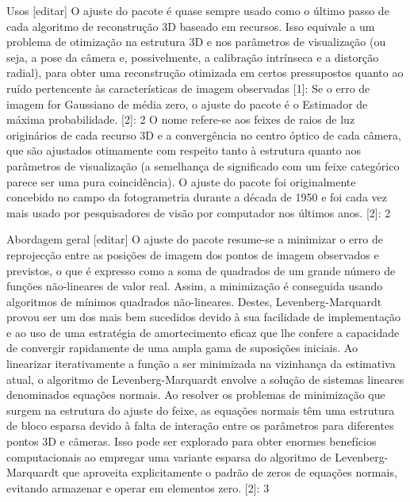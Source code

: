 \begin{itemize}
Usos [editar]
O ajuste do pacote é quase sempre usado como o último passo de cada algoritmo de reconstrução 3D baseado em recursos. Isso equivale a um problema de otimização na estrutura 3D e nos parâmetros de visualização (ou seja, a pose da câmera e, possivelmente, a calibração intrínseca e a distorção radial), para obter uma reconstrução otimizada em certos pressupostos quanto ao ruído pertencente às características de imagem observadas [1]: Se o erro de imagem for Gaussiano de média zero, o ajuste do pacote é o Estimador de máxima probabilidade. [2]: 2 O nome refere-se aos feixes de raios de luz originários de cada recurso 3D e a convergência no centro óptico de cada câmera, que são ajustados otimamente com respeito tanto à estrutura quanto aos parâmetros de visualização (a semelhança de significado com um feixe categórico parece ser uma pura coincidência). O ajuste do pacote foi originalmente concebido no campo da fotogrametria durante a década de 1950 e foi cada vez mais usado por pesquisadores de visão por computador nos últimos anos. [2]: 2

Abordagem geral [editar]
O ajuste do pacote resume-se a minimizar o erro de reprojecção entre as posições de imagem dos pontos de imagem observados e previstos, o que é expresso como a soma de quadrados de um grande número de funções não-lineares de valor real. Assim, a minimização é conseguida usando algoritmos de mínimos quadrados não-lineares. Destes, Levenberg-Marquardt provou ser um dos mais bem sucedidos devido à sua facilidade de implementação e ao uso de uma estratégia de amortecimento eficaz que lhe confere a capacidade de convergir rapidamente de uma ampla gama de suposições iniciais. Ao linearizar iterativamente a função a ser minimizada na vizinhança da estimativa atual, o algoritmo de Levenberg-Marquardt envolve a solução de sistemas lineares denominados equações normais. Ao resolver os problemas de minimização que surgem na estrutura do ajuste do feixe, as equações normais têm uma estrutura de bloco esparsa devido à falta de interação entre os parâmetros para diferentes pontos 3D e câmeras. Isso pode ser explorado para obter enormes benefícios computacionais ao empregar uma variante esparsa do algoritmo de Levenberg-Marquardt que aproveita explicitamente o padrão de zeros de equações normais, evitando armazenar e operar em elementos zero. [2]: 3












\end{itemize}
